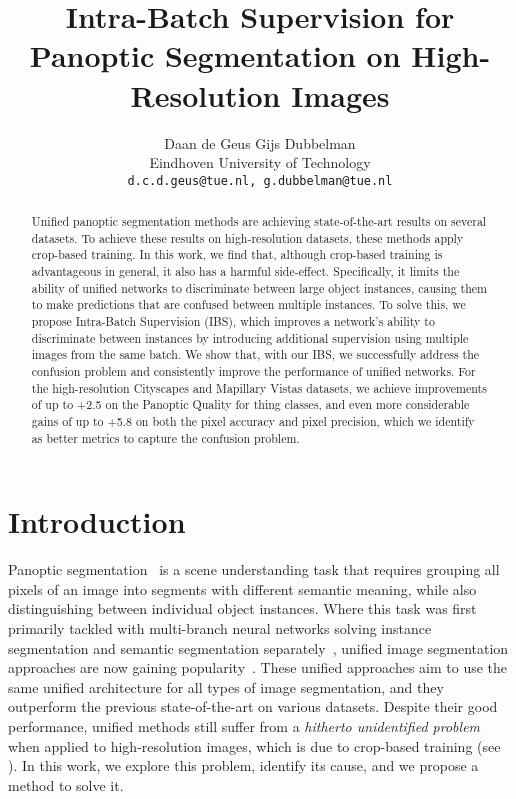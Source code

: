 \documentclass[10pt,twocolumn,letterpaper]{article}
\begin{document}
\title{Intra-Batch Supervision for Panoptic Segmentation on High-Resolution Images}


\author{Daan de Geus \quad\quad Gijs Dubbelman\\
Eindhoven University of Technology\\
{\tt\small d.c.d.geus@tue.nl, g.dubbelman@tue.nl}
}

\maketitle
\thispagestyle{empty}
\begin{abstract}
Unified panoptic segmentation methods are achieving state-of-the-art results on several datasets. To achieve these results on high-resolution datasets, these methods apply crop-based training. In this work, we find that, although crop-based training is advantageous in general, it also has a harmful side-effect. Specifically, it limits the ability of unified networks to discriminate between large object instances, causing them to make predictions that are confused between multiple instances. To solve this, we propose Intra-Batch Supervision (IBS), which improves a network's ability to discriminate between instances by introducing additional supervision using multiple images from the same batch. We show that, with our IBS, we successfully address the confusion problem and consistently improve the performance of unified networks. For the high-resolution Cityscapes and Mapillary Vistas datasets, we achieve improvements of up to +2.5 on the Panoptic Quality for thing classes, and even more considerable gains of up to +5.8 on both the pixel accuracy and pixel precision, which we identify as better metrics to capture the confusion problem.






\end{abstract} 
\section{Introduction}
\label{sec:introduction}


Panoptic segmentation~\cite{kirillov2019ps} is a scene understanding task that requires grouping all pixels of an image into segments with different semantic meaning, while also distinguishing between individual object instances. Where this task was first primarily tackled with multi-branch neural networks solving instance segmentation and semantic segmentation separately~\cite{kirillov2019panopticfpn,li2018tascnet,li2019aunet,mohan2020efficientps,xiong2019upsnet}, unified image segmentation approaches are now gaining popularity~\cite{cheng2021mask2former,cheng2021maskformer,li2021panopticfcn,wang2021maxdeeplab,zhang2021knet}. These unified approaches aim to use the same unified architecture for all types of image segmentation, and they outperform the previous state-of-the-art on various datasets. Despite their good performance, unified methods still suffer from a \textit{hitherto unidentified problem} when applied to high-resolution images, which is due to crop-based training (see ). In this work, we explore this problem, identify its cause, and we propose a method to solve it. 
\end{document}
